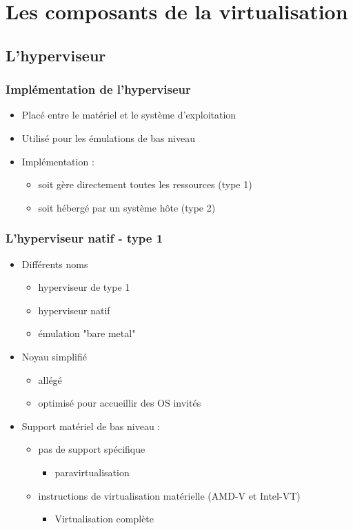 \section{Les composants de la virtualisation}
\subsection{L'hyperviseur}

\begin{frame}
\frametitle{Implémentation de l'hyperviseur}
\begin{itemize}
\item Placé entre le matériel et le système d'exploitation
\item Utilisé pour les émulations de bas niveau
\item Implémentation :
\begin{itemize}
\item soit gère directement toutes les ressources (type 1)
\item soit hébergé par un système hôte (type 2)
\end{itemize}
\end{itemize}
\end{frame}

\begin{frame}
\frametitle{L'hyperviseur natif - type 1}
\begin{itemize}
\item Différents noms
\begin{itemize}
  \item hyperviseur de type 1
  \item hyperviseur natif
  \item émulation "bare metal"
\end{itemize}
\item Noyau simplifié
\begin{itemize}
\item allégé
\item optimisé pour accueillir des OS invités
\end{itemize}
\item Support matériel de bas niveau :
\begin{itemize}
\item pas de support spécifique
\begin{itemize}
\item paravirtualisation
\end{itemize}
\item instructions de virtualisation matérielle (AMD-V et Intel-VT)
\begin{itemize}
\item Virtualisation complète
\end{itemize}
\end{itemize}
\end{itemize}
\end{frame}



